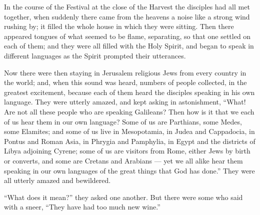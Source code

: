  In the course of the Festival at the close of the Harvest
the disciples had all met together,  when suddenly there
came from the heavens a noise like a strong wind rushing by; it filled
the whole house in which they were sitting.  Then there
appeared tongues of what seemed to be flame, separating, so that one
settled on each of them;  and they were all filled with the
Holy Spirit, and began to speak in different languages as the Spirit
prompted their utterances.

 Now there were then staying in Jerusalem religious Jews
from every country in the world;  and, when this sound was
heard, numbers of people collected, in the greatest excitement, because
each of them heard the disciples speaking in his own language.
 They were utterly amazed, and kept asking in astonishment,
``What! Are not all these people who are speaking Galileans?
 Then how is it that we each of us hear them in our own
language?  Some of us are Parthians, some Medes, some
Elamites; and some of us live in Mesopotamia, in Judea and Cappadocia,
in Pontus and Roman Asia,  in Phrygia and Pamphylia, in
Egypt and the districts of Libya adjoining Cyrene; some of us are
visitors from Rome,  either Jews by birth or converts, and
some are Cretans and Arabians --- yet we all alike hear them speaking in
our own languages of the great things that God has done.'' 
They were all utterly amazed and bewildered.

``What does it mean?'' they asked one another.  But there
were some who said with a sneer, ``They have had too much new wine.''

